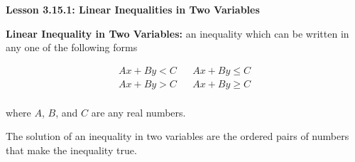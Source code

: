   \begin{center}
\textbf{Lesson 3.15.1: Linear Inequalities in Two Variables}
\end{center}

\vspace*{-1.5ex}


\textbf{Linear Inequality in Two Variables:} an inequality which can be written in any one of the following forms 

\vspace*{-5ex}
\begin{align*}
Ax+By<C &  & Ax+By \leq C \\
Ax+By>C &  & Ax+By \geq C \\
\end{align*}
\vspace*{-8ex}

where $A$, $B$,  and $C$ are any real numbers. 

 

The solution of an inequality in two variables are the ordered pairs of numbers that make the inequality true. 

